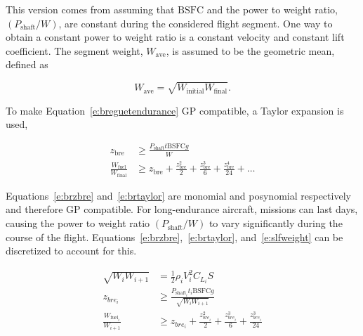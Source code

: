 This version comes from assuming that $\text{BSFC}$ and the power to weight ratio, $(P_{\text{shaft}}/W)$, are constant during the considered flight segment. 
One way to obtain a constant power to weight ratio is a constant velocity and constant lift coefficient.\cite{br2}
The segment weight, $W_{\text{ave}}$, is assumed to be the geometric mean, defined as

% 
% 
% 
% 

\begin{equation}
    \label{e:gpmean}
    W_{\text{ave}} = \sqrt{W_{\text{initial}}W_{\text{final}}}.
\end{equation}

    To make Equation~\eqref{e:breguetendurance} GP compatible, a Taylor expansion is used,\cite{hoburgthesis}

\begin{align}
    \label{e:brzbre}
    z_{\text{bre}} &\geq \frac{P_{\text{shaft}}t \text{BSFC} g}{W}\\
    \label{e:brtaylor}
    \frac{W_{\text{fuel}}}{W_\text{final}} &\geq z_{\text{bre}} + \frac{z_{\text{bre}}^2}{2} + \frac{z_{\text{bre}}^3}{6} + \frac{z_{\text{bre}}^4}{24} + \dots
\end{align}

    Equations~\eqref{e:brzbre} and~\eqref{e:brtaylor} are monomial and posynomial respectively and therefore GP compatible. For long-endurance aircraft, missions can last days, causing the power to weight ratio $(P_{\text{shaft}}/W)$ to vary significantly during the course of the flight.  
    Equations~\eqref{e:brzbre},~\eqref{e:brtaylor}, and~\eqref{e:slfweight} can be discretized to account for this.

\begin{align}
    \label{e:slfweightd}
    \sqrt{W_i W_{i+1}} &= \frac{1}{2} \rho_i V_i^2 C_{L_i} S \\
    \label{e:brzbred}
    z_{bre_i} &\geq \frac{P_{\text{shaft}_i}t_i \text{BSFC} g}{\sqrt{W_i W_{i+1}}}\\
    \label{e:brtaylord}
    \frac{W_{\text{fuel}_i}}{W_{i+1}} &\geq z_{bre_i} + \frac{z_{bre_i}^2}{2} + \frac{z_{bre_i}^3}{6} + \frac{z_{bre_i}^3}{24} 
    \end{align}

